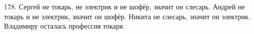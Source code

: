 178. Сергей не токарь, не электрик и не шофёр, значит он слесарь. Андрей не токарь и не электрик, значит он шофёр. Никита не слесарь, значит он электрик. Владимиру осталась профессия токаря.\\
